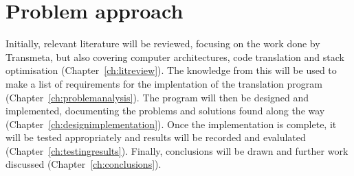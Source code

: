 \section{Problem approach}
Initially, relevant literature will be reviewed, focusing on the work done by
Transmeta, but also covering computer architectures, code translation and stack
optimisation (Chapter~\ref{ch:litreview}). The knowledge from this will be used
to make a list of requirements for the implentation of the translation program
(Chapter~\ref{ch:problemanalysis}). The program will then be designed and
implemented, documenting the problems and solutions found along the way
(Chapter~\ref{ch:designimplementation}). Once the implementation is complete, it
will be tested appropriately and results will be recorded and evalulated
(Chapter~\ref{ch:testingresults}). Finally, conclusions will be drawn and
further work discussed (Chapter~\ref{ch:conclusions}).

